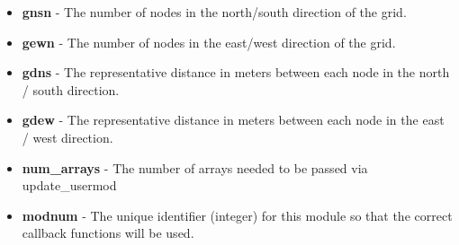 \begin{itemize}
\item \textbf{gnsn} - The number of nodes in the north/south direction of the grid.
\item \textbf{gewn} - The number of nodes in the east/west direction of the grid.
\item \textbf{gdns} - The representative distance in meters between each node in the north / south direction. 
\item \textbf{gdew} - The representative distance in meters between each node in the east / west direction.
\item \textbf{num\_arrays} - The number of arrays needed to be passed via update\_usermod
\item \textbf{modnum} - The unique identifier (integer) for this module so that the correct callback functions will be used.
\end{itemize}
